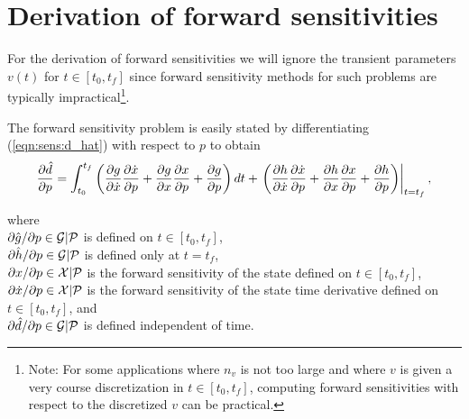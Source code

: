 \documentclass[pdf,ps2pdf,11pt]{SANDreport}
\begin{document}
%
\section{Derivation of forward sensitivities}
\label{rythmos:app:forward-sens-derivation}
%

For the derivation of forward sensitivities we will ignore the transient
parameters $v(t)$ for $t\in[t_0,t_f]$ since forward sensitivity methods for
such problems are typically impractical\footnote{Note: For some applications
where $n_v$ is not too large and where $v$ is given a very course
discretization in $t\in[t_0,t_f]$, computing forward sensitivities with respect
to the discretized $v$ can be practical.}.

The forward sensitivity problem is easily stated by differentiating
(\ref{eqn:sens:d_hat}) with respect to $p$ to obtain
%
\begin{equation}
\displaystyle{\frac{\partial \hat{d}}{\partial p}}
= \int_{t_0}^{t_f} \left(
    \displaystyle{\frac{\partial g}{\partial \dot{x}}} \displaystyle{\frac{\partial \dot{x}}{\partial p}} + \displaystyle{\frac{\partial g}{\partial x}} \displaystyle{\frac{\partial x}{\partial p}} +  \displaystyle{\frac{\partial g}{\partial p}}
    \right) dt
+ \left. \left(
    \displaystyle{\frac{\partial h}{\partial \dot{x}}} \displaystyle{\frac{\partial \dot{x}}{\partial p}} + \displaystyle{\frac{\partial h}{\partial x}} \displaystyle{\frac{\partial x}{\partial p}} + \displaystyle{\frac{\partial h}{\partial p}}
  \right) \right|_{t=t_f},
\label{eqn:sens:d_d_hat_d_p}
\end{equation}
\begin{tabbing}
\hspace{4ex}where\hspace{1ex}\= \\
\>  $\partial \hat{g} / \partial p \in \mathcal{G}|\mathcal{P}$ is defined on $t\in[t_0,t_f]$, \\
\>  $\partial \hat{h} / \partial p \in \mathcal{G}|\mathcal{P}$ is defined only at $t=t_f$, \\
\>  $\partial x / \partial p \in \mathcal{X}|\mathcal{P}$ is the forward sensitivity of the state defined on $t\in[t_0,t_f]$, \\
\>  $\partial \dot{x} / \partial p \in \mathcal{X}|\mathcal{P}$ is the forward sensitivity of the state time derivative defined on $t\in[t_0,t_f]$, and \\
\>  $\partial \hat{d} / \partial p \in \mathcal{G}|\mathcal{P}$ is defined independent of time.
\end{tabbing}
\end{document}
